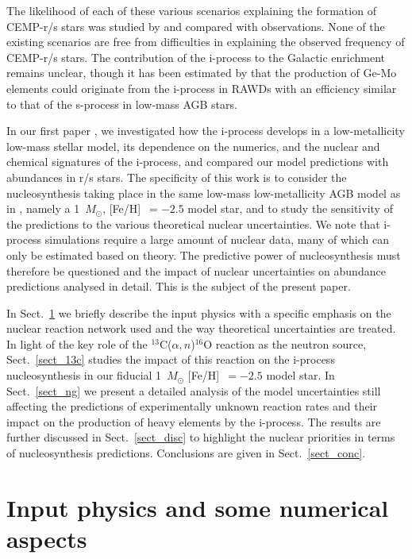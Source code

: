 \documentclass{aa}
\def\iso#1{$^{#1}$}
\def\Msun{$M_{\odot}$}
\def\msun{M_{\odot}}
\def\an{$\alpha,n$}
\begin{document}
The likelihood of each of these various scenarios explaining the formation of CEMP-r/s stars was studied by \citet{Abate16} and compared with observations. None of the existing scenarios are free from difficulties in explaining the observed frequency of CEMP-r/s stars.
The contribution of the i-process to the Galactic enrichment remains unclear, though it has been estimated by \citet{Denissenkov17} that the production of Ge-Mo elements could originate from the i-process in RAWDs with an efficiency similar to that of the s-process in low-mass AGB stars.

In our first paper \citep{Choplin21},  we investigated how the i-process develops in a low-metallicity low-mass stellar model, its dependence on the numerics, and the nuclear and chemical signatures of the i-process, and compared our model predictions with abundances in r/s stars.
The specificity of this work is to consider the nucleosynthesis taking place in the same low-mass low-metallicity AGB model as in \citet{Choplin21}, namely a 1~\Msun{}, [Fe/H]~$=-2.5$ model star, and to study the sensitivity of the predictions to the various theoretical nuclear uncertainties. We note that i-process simulations require a large amount of nuclear data, many of which can only be estimated based on theory. The predictive power of nucleosynthesis must therefore be questioned and the impact of nuclear uncertainties on abundance predictions analysed in detail. This is the subject of the present paper.

In Sect.~\ref{sect_mod} we briefly describe the input physics with a specific emphasis on the nuclear reaction network used and the way theoretical uncertainties are treated. In light of the key role of the \iso{13}C(\an)\iso{16}O reaction as the neutron source, Sect.~\ref{sect_13c} studies the impact of this reaction on the i-process nucleosynthesis in our fiducial 1~$\msun$ [Fe/H]~$=-2.5$ model star. In Sect.~\ref{sect_ng} we present a detailed analysis of the model uncertainties still affecting the predictions of experimentally unknown reaction rates and their impact on the production of heavy elements by the i-process. The results are further discussed in Sect.~\ref{sect_disc} to highlight the nuclear priorities in terms of nucleosynthesis predictions. Conclusions are given in Sect.~\ref{sect_conc}.







\section{Input physics and some numerical aspects}
\label{sect_mod}
\end{document}
